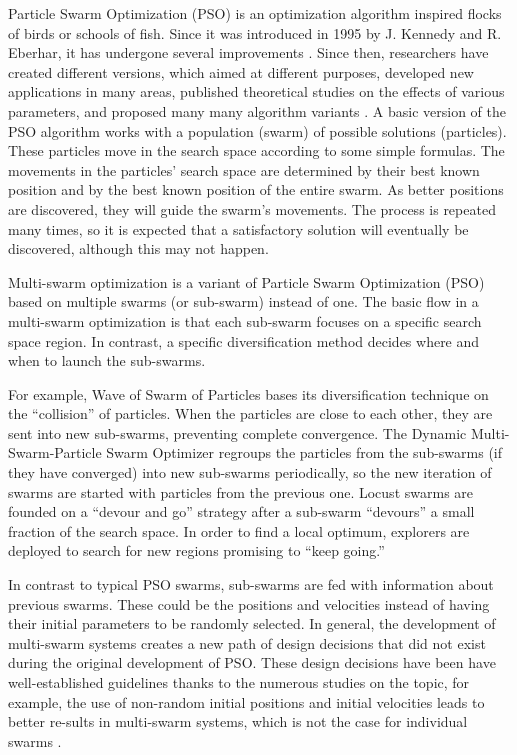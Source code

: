 \documentclass[runningheads]{llncs}
\begin{document}
Particle Swarm Optimization (PSO) is an optimization algorithm
inspired flocks of birds or schools of fish. Since it was introduced in 1995 by  J. Kennedy and
R. Eberhar, it has undergone several improvements \cite{b1}. %
Since then, researchers have created different versions, which aimed at different
purposes, developed new applications in many areas, published theoretical
studies on the effects of various parameters, and proposed many many
algorithm variants \cite{b2}. A basic version of the PSO algorithm
works with a population (swarm) of possible solutions
(particles). These particles move in the search space according to
some simple formulas. The movements in the particles' search space are
determined by their best known position and by the best known position
of the entire swarm. As better positions are discovered, they will
guide the swarm's movements. The process is repeated many times, so it
is expected that a satisfactory solution will eventually be
discovered, although this may not happen\cite{b3}.


Multi-swarm optimization is a variant of Particle Swarm Optimization
(PSO) based on multiple swarms (or sub-swarm) instead of one. The basic flow in
a multi-swarm optimization is that each sub-swarm focuses on a specific search
space region. In contrast, a specific diversification method decides where and
when to launch the sub-swarms.

For example, Wave of Swarm of Particles \cite{b6} bases its
diversification technique on the ``collision'' of particles. When the
particles are close to each other, they are sent into new sub-swarms,
preventing complete convergence. The Dynamic Multi-Swarm-Particle
Swarm Optimizer\cite{b7} regroups the particles from the sub-swarms
(if they have converged) into new sub-swarms periodically, so the new
iteration of swarms are started with particles from the previous
one. Locust swarms \cite{b8} are founded on a ``devour and go'' strategy
after a sub-swarm ``devours'' a small fraction of the search space. In
order to find a local optimum, explorers are deployed to search for
new regions promising to ``keep going.''

In contrast to typical PSO swarms, sub-swarms are fed with information about
previous swarms. These could be the positions and velocities instead of having
their initial parameters to be randomly selected. In general, the development of
multi-swarm systems creates a new path of design decisions that did not exist
during the original development of PSO. These design decisions have been have
well-established guidelines thanks to the numerous studies on the topic, for
example, the use of non-random initial positions and initial velocities leads to
better re-sults in multi-swarm systems, which is not the case for individual
swarms \cite{b9}.
\end{document}
